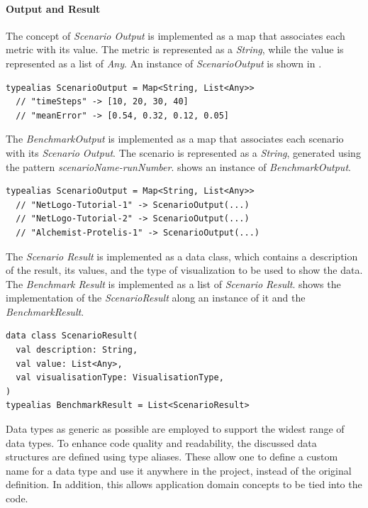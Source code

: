 \documentclass[12pt,a4paper,openright,twoside]{book}
\begin{document}
\paragraph*{Output and Result}
The concept of \emph{Scenario Output} is implemented as a map that associates each metric with its value.
The metric is represented as a \textit{String}, while the value is represented as a list of \textit{Any}.
An instance of \emph{ScenarioOutput} is shown in .
\begin{lstlisting}[style=my-kotlin, language=my-kotlin, label={lst:scenario-output-implementation}, caption={ScenarioOutput implementation.}]
  typealias ScenarioOutput = Map<String, List<Any>>
  // "timeSteps" -> [10, 20, 30, 40]
  // "meanError" -> [0.54, 0.32, 0.12, 0.05]
\end{lstlisting}

The \emph{BenchmarkOutput} is implemented as a map that associates each scenario with its \emph{Scenario Output}.
The scenario is represented as a \textit{String}, generated using the pattern \textit{{scenarioName}-{runNumber}}.
 shows an instance of \emph{BenchmarkOutput}.
\begin{lstlisting}[style=my-kotlin, language=my-kotlin, label={lst:benchmark-output-impl}, caption={BenchmarkOutput implementation.}]
  typealias ScenarioOutput = Map<String, List<Any>>
  // "NetLogo-Tutorial-1" -> ScenarioOutput(...)
  // "NetLogo-Tutorial-2" -> ScenarioOutput(...)
  // "Alchemist-Protelis-1" -> ScenarioOutput(...)
\end{lstlisting}

The \emph{Scenario Result} is implemented as a data class, which contains a description of the result, its values, and the type of visualization to be used to show the data.
The \emph{Benchmark Result} is implemented as a list of \emph{Scenario Result}.
 shows the implementation of the \emph{ScenarioResult} along an instance of it and the \emph{BenchmarkResult}.

\begin{lstlisting}[style=my-kotlin, language=my-kotlin, label={lst:benchmark-result-impl}, caption={BenchmarkResult and ScenarioResult implementation.}]
data class ScenarioResult(
  val description: String,
  val value: List<Any>,
  val visualisationType: VisualisationType,
)
typealias BenchmarkResult = List<ScenarioResult>
\end{lstlisting}

Data types as generic as possible are employed to support the widest range of data types. 
To enhance code quality and readability, the discussed data structures are defined using type aliases. 
These allow one to define a custom name for a data type and use it anywhere in the project, instead of the original definition.
In addition, this allows application domain concepts to be tied into the code.
\end{document}
